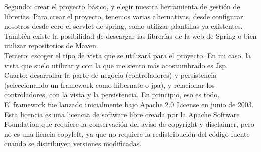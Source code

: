 \begin{itemize}
		Segundo: crear el proyecto básico, y elegir nuestra herramienta de gestión de librerías. Para crear el proyecto, tenemos varias alternativas, desde configurar nosotros desde cero el servlet de spring, como utilizar plantillas ya existentes. También existe la posibilidad de descargar las librerías de la web de Spring o bien utilizar repositorios de Maven.\\
		
		Tercero: escoger el tipo de vista que se utilizará para el proyecto. En mi caso, la vista que suelo utilizar y con la que me siento más acostumbrado es Jsp.\\
		
		Cuarto: desarrollar la parte de negocio (controladores) y persistencia (seleccionando un framework como hibernate o jpa), y relacionar los controladores, con la vista y la persistencia.
		En principio, eso es todo.\\
		El framework fue lanzado inicialmente bajo Apache 2.0 License en junio de 2003. Esta licencia es una licencia de software libre creada por la Apache Software Foundation que requiere la conservación del aviso de copyright y disclaimer, pero no es una liencia copyleft, ya que no requiere la redistribución del código fuente cuando se distribuyen versiones modificadas. \cite{introspring} \\
	\end{itemize}

